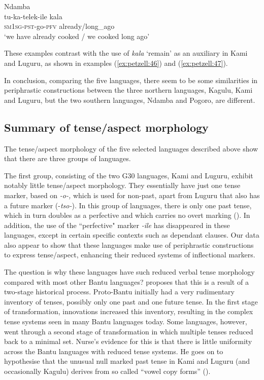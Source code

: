 \documentclass[output=paper,
            colorlinks, citecolor=brown
            ,draftmode
		  ]{langscibook}
\begin{document}
\ea\label{ex:petzell:56}Ndamba\\
\gll tu-ka-telek-ile      kala  \\
\textsc{sm}1\textsc{sg}{}-\textsc{pst}{}-go-\textsc{pfv}  {already/long\_ago}\\
\glt `we have already cooked / we cooked long ago'
\z


These examples contrast with the use of \textit{kala} ‘remain’ as an auxiliary in Kami and Luguru, as shown in examples (\ref{ex:petzell:46}) and (\ref{ex:petzell:47}).



In conclusion, comparing the five languages, there seem to be some similarities in periphrastic constructions between the three northern languages, Kagulu, Kami and Luguru, but the two southern languages, Ndamba and Pogoro, are different.


\subsection{Summary of tense/aspect morphology}\label{sec:petzell:3.9}

The tense/aspect morphology of the five selected languages described above show that there are three groups of languages.



The first group, consisting of the two G30 languages, Kami and Luguru, exhibit notably little tense/aspect morphology. They essentially have just one tense marker, based on \textit{{}-o-,} which is used for non-past, apart from Luguru that also has a future marker (-\textit{tso-}). In this group of languages, there is only one past tense, which in turn doubles as a perfective and which carries no overt marking (\citealt{Bar-elPetzell2021}). In addition, the use of the “perfective" marker \textit{{}-ile} has disappeared in these languages, except in certain specific contexts such as dependant clauses. Our data also appear to show that these languages make use of periphrastic constructions to express tense/aspect, enhancing their reduced systems of inflectional markers.



The question is why these languages have such reduced verbal tense morphology compared with most other Bantu languages? \citet[103]{Nurse2008} proposes that this is a result of a two-stage historical process. Proto-Bantu initially had a very rudimentary inventory of tenses, possibly only one past and one future tense. In the first stage of transformation, innovations increased this inventory, resulting in the complex tense systems seen in many Bantu languages today. Some languages, however, went through a second stage of transformation in which multiple tenses reduced back to a minimal set. Nurse's evidence for this is that there is little uniformity across the Bantu languages with reduced tense systems. He goes on to hypothesise that the unusual null marked past tense in Kami and Luguru (and occasionally Kagulu) derives from so called “vowel copy forms” (\citealt[84--85]{Nurse2008}).
\end{document}
